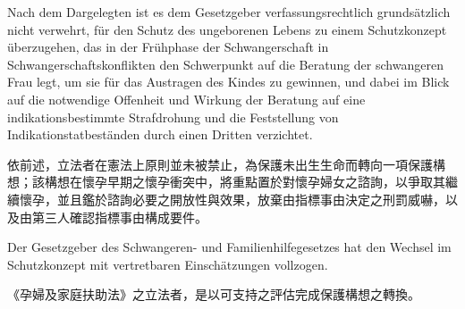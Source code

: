 \documentclass[12pt]{article}
\begin{document}

\begin{sourcepara}[title={原文D.70}]
Nach dem Dargelegten ist es dem Gesetzgeber verfassungsrechtlich grundsätzlich nicht verwehrt, für den Schutz des ungeborenen Lebens zu einem Schutzkonzept überzugehen, das in der Frühphase der Schwangerschaft in Schwangerschaftskonflikten den Schwerpunkt auf die Beratung der schwangeren Frau legt, um sie für das Austragen des Kindes zu gewinnen, und dabei im Blick auf die notwendige Offenheit und Wirkung der Beratung auf eine indikationsbestimmte Strafdrohung und die Feststellung von Indikationstatbeständen durch einen Dritten verzichtet.
\end{sourcepara}
\begin{transpara}
依前述，立法者在憲法上原則並未被禁止，為保護未出生生命而轉向一項保護構想；該構想在懷孕早期之懷孕衝突中，將重點置於對懷孕婦女之諮詢，以爭取其繼續懷孕，並且鑑於諮詢必要之開放性與效果，放棄由指標事由決定之刑罰威嚇，以及由第三人確認指標事由構成要件。
\end{transpara}

\begin{sourcepara}[title={原文D.71}]
Der Gesetzgeber des Schwangeren- und Familienhilfegesetzes hat den Wechsel im Schutzkonzept mit vertretbaren Einschätzungen vollzogen.
\end{sourcepara}
\begin{transpara}
《孕婦及家庭扶助法》之立法者，是以可支持之評估完成保護構想之轉換。
\end{transpara}
\end{document}
